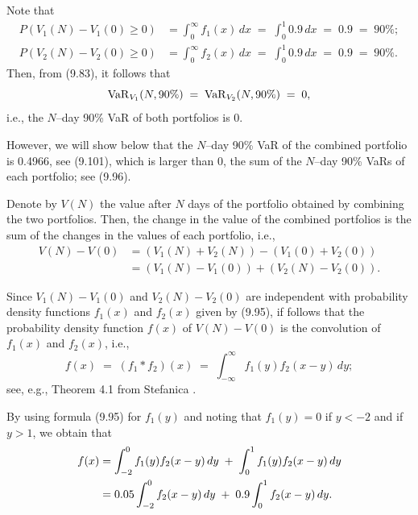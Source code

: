 
Note that
\[
\begin{aligned}
P(V_1(N)-V_1(0)\ge 0) &= \int_0^\infty f_1(x)\,dx \;=\; \int_0^1 0.9\,dx \;=\; 0.9 \;=\; 90\%;\\
P(V_2(N)-V_2(0)\ge 0) &= \int_0^\infty f_2(x)\,dx \;=\; \int_0^1 0.9\,dx \;=\; 0.9 \;=\; 90\%.
\end{aligned}
\]
Then, from (9.83), it follows that
\begin{equation}
\operatorname{VaR}_{V_1}(N,90\%) \;=\; \operatorname{VaR}_{V_2}(N,90\%) \;=\; 0,
\end{equation}
i.e., the $N$--day 90\% VaR of both portfolios is 0.

However, we will show below that the $N$--day 90\% VaR of the combined
portfolio is 0.4966, see (9.101), which is larger than 0, the sum of the
$N$--day 90\% VaRs of each portfolio; see (9.96).

Denote by $V(N)$ the value after $N$ days of the portfolio obtained by
combining the two portfolios. Then, the change in the value of the combined
portfolios is the sum of the changes in the values of each portfolio, i.e.,
\[
\begin{aligned}
V(N)-V(0) &= (V_1(N)+V_2(N)) - (V_1(0)+V_2(0))\\
&= (V_1(N)-V_1(0)) + (V_2(N)-V_2(0)).
\end{aligned}
\]

Since $V_1(N)-V_1(0)$ and $V_2(N)-V_2(0)$ are independent with probability
density functions $f_1(x)$ and $f_2(x)$ given by (9.95), if follows that the
probability density function $f(x)$ of $V(N)-V(0)$ is the convolution of
$f_1(x)$ and $f_2(x)$, i.e.,
\[
f(x) \;=\; (f_1 * f_2)(x) \;=\; \int_{-\infty}^{\infty} f_1(y) f_2(x-y)\,dy;
\]
see, e.g., Theorem 4.1 from Stefanica \cite{36}.

By using formula (9.95) for $f_1(y)$ and noting that $f_1(y)=0$ if $y<-2$ and
if $y>1$, we obtain that
\begin{align}
f(x) &= \int_{-2}^0 f_1(y)f_2(x-y)\,dy \;+\; \int_0^1 f_1(y)f_2(x-y)\,dy \notag\\
&= 0.05\int_{-2}^0 f_2(x-y)\,dy \;+\; 0.9\int_0^1 f_2(x-y)\,dy.
\end{align}

